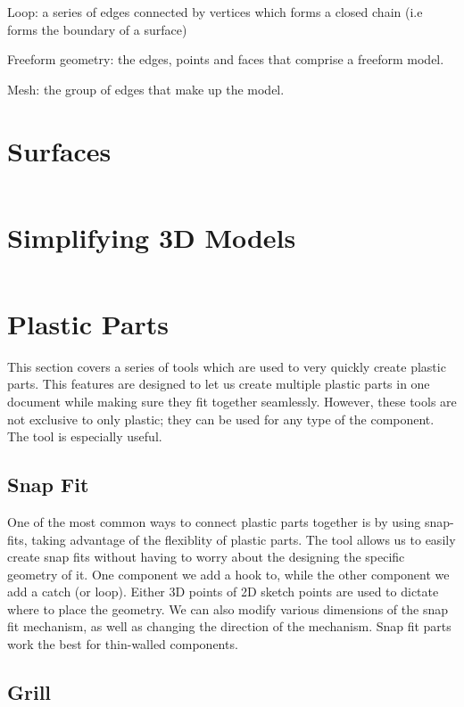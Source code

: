 Loop: a series of edges connected by vertices which forms a closed chain (i.e forms the boundary of a surface)

Freeform geometry: the edges, points and faces that comprise a freeform model.

Mesh: the group of edges that make up the model.

\section{Surfaces}
\label{section: 3D Model Surface}

$ $

\section{Simplifying 3D Models}

$ $

\section{Plastic Parts}
\mediumdifficulty

This section covers a series of tools which are used to very quickly create plastic parts. This features are designed to let us create multiple plastic parts in one document while making sure they fit together seamlessly. However, these tools are not exclusive to only plastic; they can be used for any type of the component. The  tool is especially useful.

\subsection{Snap Fit}

One of the most common ways to connect plastic parts together is by using snap-fits, taking advantage of the flexiblity of plastic parts. The  tool allows us to easily create snap fits without having to worry about the designing the specific geometry of it. One component we add a hook to, while the other component we add a catch (or loop). Either 3D points of 2D sketch points are used to dictate where to place the geometry. We can also modify various dimensions of the snap fit mechanism, as well as changing the direction of the mechanism. Snap fit parts work the best for thin-walled components.

\subsection{Grill}


